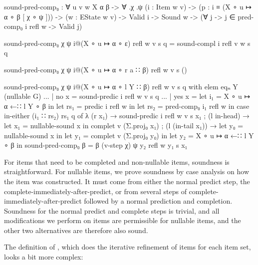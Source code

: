		\begin{code}
			  sound-pred-comp₀ : ∀ {u v w X α β} -> ∀ .χ .ψ
			    (i : Item w v) -> (p : i ≡ (X ∘ u ↦ α ∘ β [ χ ∘ ψ ])) ->
			    (w : EState w v) ->
			    Valid i -> Sound w ->
			    (∀ {j} -> j ∈ pred-comp₀ i refl w -> Valid j)
			
			  sound-pred-comp₀ χ ψ i@(X ∘ u ↦ α ∘ ε) refl w v s q =
			    sound-compl i refl v w s q
			
			  sound-pred-comp₀ χ ψ i@(X ∘ u ↦ α ∘ r a ∷ β) refl w v s ()
			
			  sound-pred-comp₀ χ ψ i@(X ∘ u ↦ α ∘ l Y ∷ β) refl w v s q 
			  	  with elem eqₙ Y (nullable G)
			  ... | no x = sound-predic i refl w v s q
			  ... | yes x =
			    let i₁ = X ∘ u ↦ α ←∷ l Y ∘ β in
			    let rs₁ = predic i refl w in
			    let rs₂ = pred-comp₀ i₁ refl w in
			    case in-either (i₁ ∷ rs₂) rs₁ q of
			      λ { (r x₁) → sound-predic i refl w v s x₁
			        ; (l in-head) →
			          let x₁ = nullable-sound x in
			          complet v (Σ.proj₀ x₁)
			        ; (l (in-tail x₁)) →
			          let y₀ = nullable-sound x in
			          let y₁ = complet v (Σ.proj₀ y₀) in
			          let y₂ = X ∘ u ↦ α ←∷ l Y ∘ β in
			          sound-pred-comp₀ {β = β} (v-step χ) ψ y₂ refl w y₁ s x₁
			        }
		\end{code}

		For items that need to be completed and non-nullable items, soundness
		is straightforward. For nullable items, we prove soundness by case
		analysis on how the item was constructed. It must come from either the
		normal predict step, the complete-immediately-after-predict, or from
		several steps of complete-immediately-after-predict followed by a
		normal prediction and completion. Soundness for the normal predict and
		complete steps is trivial, and all modifications we perform on items
		are permissible for nullable items, and the other two alternatives are
		therefore also sound.

		The definition of , which does the iterative
		refinement of items for each item set, looks a bit more complex:

